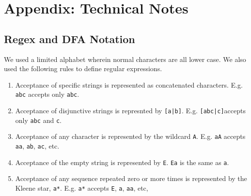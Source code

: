 \documentclass[10pt,letterpaper]{article}
\begin{document}


% 


% 

\section{Appendix: Technical Notes}
\subsection{Regex and DFA Notation}
We used a limited alphabet wherein normal characters are all lower case. We also used the following rules to define regular expressions.
\begin{enumerate}
	\item Acceptance of specific strings is represented as concatenated characters. E.g. \verb!abc! accepts only \verb!abc!.
	\item Acceptance of disjunctive strings is represnted by \verb![a|b]!. E.g. \verb![abc|c]!accepts only \verb!abc! and \verb!c!.
	\item Acceptance of any character is represented by the wildcard \verb!A!. E.g. \verb!aA! accepts \verb!aa!, \verb!ab!, \verb!ac!, etc.
	\item Acceptance of the empty string is represented by \verb!E!. \verb!Ea! is the same as \verb!a!.
	\item Acceptance of any sequence repeated zero or more times is represented by the Kleene star, \verb!a*!. E.g. \verb!a*! accepts \verb!E!, \verb!a!, \verb!aa!, etc, 
\end{enumerate}
\end{document}
